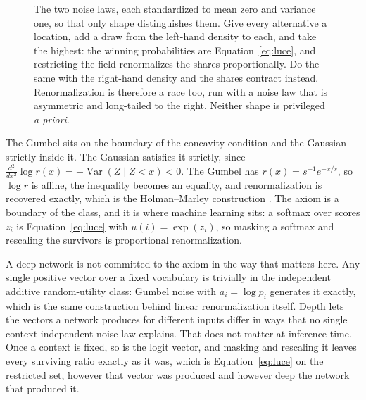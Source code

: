 \documentclass[11pt]{article}
\theoremstyle{italichead}
\begin{document}
\begin{figure}[t]
\caption{The two noise laws, each standardized to mean zero and variance one, so that only
shape distinguishes them. Give every alternative a location, add a draw from the left-hand
density to each, and take the highest: the winning probabilities are Equation~\eqref{eq:luce},
and restricting the field renormalizes the shares proportionally. Do the same with the
right-hand density and the shares contract instead. Renormalization is therefore a race too,
run with a noise law that is asymmetric and long-tailed to the right. Neither shape is privileged
\emph{a priori}.}
\label{fig:noise}
\end{figure}

The Gumbel sits on the boundary of the concavity condition and the Gaussian strictly inside
it. The Gaussian satisfies it strictly, since
$\frac{d^2}{dx^2}\log r(x) = -\operatorname{Var}(Z \mid Z < x) < 0$. The Gumbel has
$r(x) = s^{-1}e^{-x/s}$, so $\log r$ is affine, the inequality becomes an equality, and
renormalization is recovered exactly, which is the Holman--Marley construction
\cite{lucesuppes1965,holman1974}. The axiom is a boundary of the class, and it is where
machine learning sits: a softmax over scores $z_i$ is Equation~\eqref{eq:luce} with
$u(i) = \exp(z_i)$, so masking a softmax and rescaling the survivors is proportional
renormalization.

A deep network is not committed to the axiom in the way that matters here. Any single
positive vector over a fixed vocabulary is trivially in the independent additive random-utility
class: Gumbel noise with $a_i = \log p_i$ generates it exactly, which is the same construction
behind linear renormalization itself. Depth lets the vectors a network produces for different
inputs differ in ways that no single context-independent noise law explains. That does not matter
at inference time. Once a context is
fixed, so is the logit vector, and masking and rescaling it leaves every surviving ratio exactly
as it was, which is Equation~\eqref{eq:luce} on the restricted set, however that vector was
produced and however deep the network that produced it.
\end{document}
